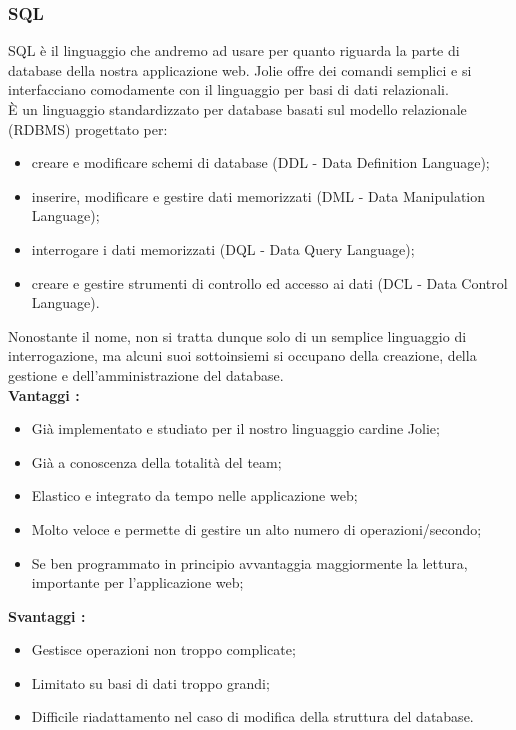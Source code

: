 {		\subsubsection{SQL}{
			SQL è il linguaggio che andremo ad usare per quanto riguarda la parte di database della nostra applicazione web. Jolie offre dei comandi semplici e si interfacciano comodamente con il linguaggio per basi di dati relazionali.\\
			È un linguaggio standardizzato per database basati sul modello relazionale (RDBMS) progettato per:
			\begin{itemize}
				\item creare e modificare schemi di database (DDL - Data Definition Language);
				\item inserire, modificare e gestire dati memorizzati (DML - Data Manipulation Language);
				\item interrogare i dati memorizzati (DQL - Data Query Language);
				\item creare e gestire strumenti di controllo ed accesso ai dati (DCL - Data Control Language).
			\end{itemize}
			Nonostante il nome, non si tratta dunque solo di un semplice linguaggio di interrogazione, ma alcuni suoi sottoinsiemi si occupano della creazione, della gestione e dell'amministrazione del database.\\
			\textbf{Vantaggi :}
			\begin{itemize}\itemsep1pt
				\item Già implementato e studiato per il nostro linguaggio cardine Jolie;
				\item Già a conoscenza della totalità del team;
				\item Elastico e integrato da tempo nelle applicazione web;
				\item Molto veloce e permette di gestire un alto numero di operazioni/secondo;
				\item Se ben programmato in principio avvantaggia maggiormente la lettura, importante per l'applicazione web;
				
			\end{itemize}
			\textbf{Svantaggi :}
			\begin{itemize}\itemsep1pt
				\item Gestisce operazioni non troppo complicate;
				\item Limitato su basi di dati troppo grandi;
				\item Difficile riadattamento nel caso di modifica della struttura del database.
			\end{itemize}
		}
	}
